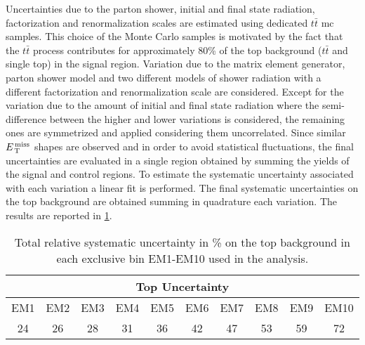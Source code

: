 Uncertainties due to the parton shower, initial and final state radiation,
factorization and renormalization scales are estimated using dedicated
$t \bar{t}$ \gls{mc} samples. This choice of the Monte Carlo samples is
motivated by the fact that the $t \bar{t}$ process contributes for approximately
80\% of the top background ($t \bar{t}$ and single top) in the signal
region. Variation due to the matrix element generator, parton shower model and
two different models of shower radiation with a different factorization and
renormalization scale are considered. Except for the variation due to the amount of
initial and final state radiation where the semi-difference between the higher and
lower variations is considered, the remaining ones are symmetrized and applied
considering them uncorrelated. Since similar $E_\mathrm{\, T}^\mathrm{\, miss}$ shapes are observed and in
order to avoid statistical fluctuations, the final uncertainties are evaluated
in a single region obtained by summing the yields of the signal and control
regions. To estimate the systematic uncertainty associated with each variation a
linear fit is performed. The final systematic uncertainties on the top
background are obtained summing in quadrature each variation. The results are
reported in \cref{tab:top_syst_2016}.
\begin{table}[!ht]
  \centering
  \begin{tabular}{cccccccccc}
    \toprule
    \multicolumn{10}{c}{Top Uncertainty} \\
    \midrule \midrule
    EM1 & EM2 & EM3 & EM4 & EM5 & EM6 & EM7 & EM8 & EM9 & EM10 \\
    \midrule
    24 & 26 & 28 & 31 & 36 & 42 & 47 & 53 & 59 & 72 \\
    \bottomrule
  \end{tabular}
  \caption{Total relative systematic uncertainty in \% on the top background in
    each exclusive bin EM1-EM10 used in the analysis.}
  \label{tab:top_syst_2016}
\end{table}

